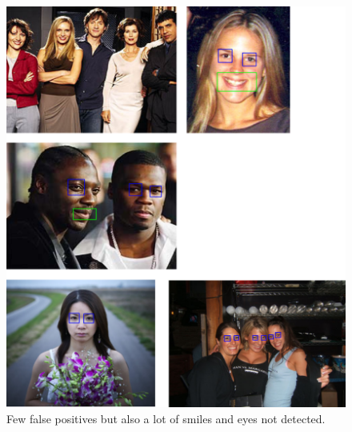 \documentclass[11pt, a4paper, twocolumn]{article}
\begin{document}
\begin{figure}[h]
 \includegraphics[width=1.0\columnwidth]{images/01_fewFalsePositives_fewDetected.png}
 \centering
 \caption{Few false positives but also a lot of smiles and eyes not detected.}
 \label{fig:01_fewFalsePositives}
\end{figure}
\end{document}

